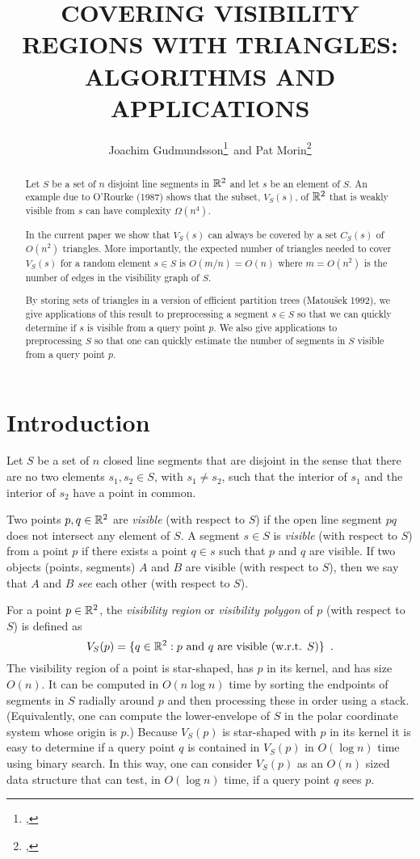 \documentclass{patmorin}
\title{\MakeUppercase{Covering Visibility Regions with Triangles:\newline
       Algorithms and Applications}}
\author{Joachim Gudmundsson\thanks{\affil{NICTA},
\email{joachim.gudmundsson@nicta.com.au}}\, 
       and Pat Morin\thanks{\affil{Carleton University},
\email{morin@scs.carleton.ca}}}
\begin{document}
\maketitle
\begin{abstract}
Let $S$ be a set of $n$ disjoint line segments in $\mathbb{R}^2$ and let $s$
be an element of $S$.  An example due to O'Rourke (1987) shows that the
subset, $V_S(s)$, of $\mathbb{R}^2$ that is weakly visible from $s$ can have
complexity $\Omega(n^4)$.

In the current paper we show that $V_S(s)$ can always be covered by a set
$C_S(s)$ of $O(n^2)$ triangles.  More importantly, the expected number
of triangles needed to cover $V_S(s)$ for a random element $s\in S$ is
$O(m/n)=O(n)$ where $m=O(n^2)$ is the number of edges in the visibility
graph of $S$.

By storing sets of triangles in a version of efficient partition trees
(Matou\v{s}ek 1992), we give applications of this result to preprocessing
a segment $s\in S$ so that we can quickly determine if $s$ is visible
from a query point $p$.  We also give applications to preprocessing $S$
so that one can quickly estimate the number of segments in $S$ visible
from a query point $p$.
\end{abstract}

\section{Introduction}

Let $S$ be a set of $n$ closed line segments that are disjoint in the
sense that there are no two elements $s_1,s_2\in S$, with $s_1\neq s_2$,
such that the interior of $s_1$ and the interior of $s_2$ have a point
in common.

Two points $p,q\in\mathbb{R}^2$ are \emph{visible} (with respect to $S$) if the
open line segment $pq$ does not intersect any element of $S$.  A segment
$s\in S$ is \emph{visible} (with respect to $S$) from a point $p$ if there
exists a point $q\in s$ such that $p$ and $q$ are visible.  If two objects
(points, segments) $A$ and $B$ are visible (with respect to $S$), then we
say that $A$ and $B$ \emph{see} each other (with respect to $S$).

For a point $p\in\mathbb{R}^2$, the \emph{visibility region} or \emph{visibility
polygon} of $p$ (with respect to $S$) is defined as
\[
   V_S(p)=\{q\in\mathbb{R}^2:\mbox{$p$ and $q$ are visible (w.r.t. $S$)}\} 
      \enspace .
\]
The visibility region of a point is star-shaped, has $p$ in its
kernel, and has size $O(n)$. It can be computed in $O(n\log n)$ time
by sorting the endpoints of segments in $S$ radially around $p$ and
then processing these in order using a stack. (Equivalently, one can
compute the lower-envelope of $S$ in the polar coordinate system whose
origin is $p$.)  Because $V_S(p)$ is star-shaped with $p$ in its kernel
it is easy to determine if a query point $q$ is contained in $V_S(p)$
in $O(\log n)$ time using binary search. In this way, one can consider
$V_S(p)$ as an $O(n)$ sized data structure that can test, in $O(\log n)$
time, if a query point $q$ sees $p$.
\end{document}
